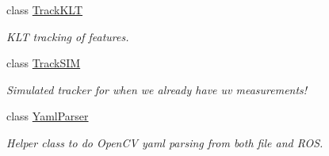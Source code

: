 \begin{DoxyCompactItemize}
class \hyperlink{classov__core_1_1TrackKLT}{Track\+K\+LT}
\begin{DoxyCompactList}\small\item\em K\+LT tracking of features. \end{DoxyCompactList}\item 
class \hyperlink{classov__core_1_1TrackSIM}{Track\+S\+IM}
\begin{DoxyCompactList}\small\item\em Simulated tracker for when we already have uv measurements! \end{DoxyCompactList}\item 
class \hyperlink{classov__core_1_1YamlParser}{Yaml\+Parser}
\begin{DoxyCompactList}\small\item\em Helper class to do Open\+CV yaml parsing from both file and R\+OS. \end{DoxyCompactList}\end{DoxyCompactItemize}
